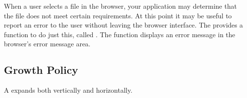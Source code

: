 When a user selects a file in the browser, your application may
determine that the file does not meet certain requirements.  At this
point it may be useful to report an error to the user without leaving
the browser interface.  The  provides a function to do
just this, called .  The function displays an
error message in the browser's error message area.


\subsection{Growth Policy}

A  expands both vertically and horizontally.
